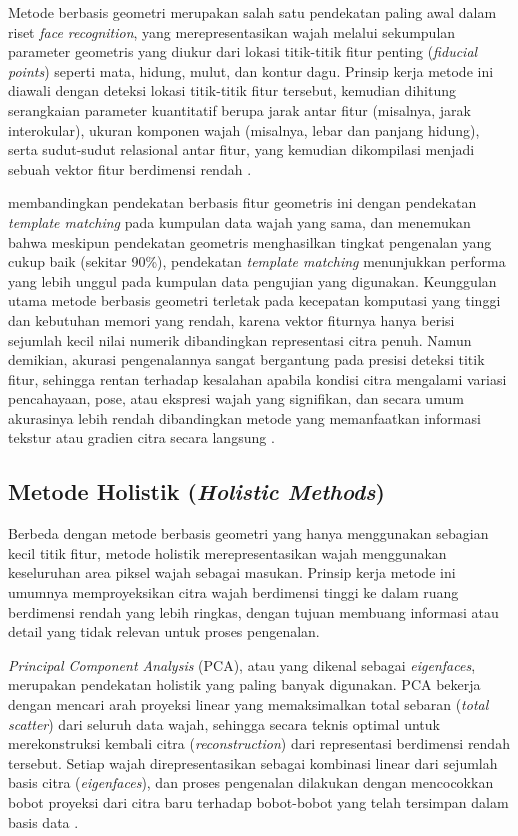 Metode berbasis geometri merupakan salah satu pendekatan paling awal dalam riset \textit{face recognition}, yang merepresentasikan wajah melalui sekumpulan parameter geometris yang diukur dari lokasi titik-titik fitur penting (\textit{fiducial points}) seperti mata, hidung, mulut, dan kontur dagu. Prinsip kerja metode ini diawali dengan deteksi lokasi titik-titik fitur tersebut, kemudian dihitung serangkaian parameter kuantitatif berupa jarak antar fitur (misalnya, jarak interokular), ukuran komponen wajah (misalnya, lebar dan panjang hidung), serta sudut-sudut relasional antar fitur, yang kemudian dikompilasi menjadi sebuah vektor fitur berdimensi rendah \autocite{Brunelli1993, Zhao2003}.

\textcite{Brunelli1993} membandingkan pendekatan berbasis fitur geometris ini dengan pendekatan \textit{template matching} pada kumpulan data wajah yang sama, dan menemukan bahwa meskipun pendekatan geometris menghasilkan tingkat pengenalan yang cukup baik (sekitar 90\%), pendekatan \textit{template matching} menunjukkan performa yang lebih unggul pada kumpulan data pengujian yang digunakan. Keunggulan utama metode berbasis geometri terletak pada kecepatan komputasi yang tinggi dan kebutuhan memori yang rendah, karena vektor fiturnya hanya berisi sejumlah kecil nilai numerik dibandingkan representasi citra penuh. Namun demikian, akurasi pengenalannya sangat bergantung pada presisi deteksi titik fitur, sehingga rentan terhadap kesalahan apabila kondisi citra mengalami variasi pencahayaan, pose, atau ekspresi wajah yang signifikan, dan secara umum akurasinya lebih rendah dibandingkan metode yang memanfaatkan informasi tekstur atau gradien citra secara langsung \autocite{Trigueros2018}.

\subsection{Metode Holistik (\textit{Holistic Methods})}

Berbeda dengan metode berbasis geometri yang hanya menggunakan sebagian kecil titik fitur, metode holistik merepresentasikan wajah menggunakan keseluruhan area piksel wajah sebagai masukan. Prinsip kerja metode ini umumnya memproyeksikan citra wajah berdimensi tinggi ke dalam ruang berdimensi rendah yang lebih ringkas, dengan tujuan membuang informasi atau detail yang tidak relevan untuk proses pengenalan.

\textit{Principal Component Analysis} (PCA), atau yang dikenal sebagai \textit{eigenfaces}, merupakan pendekatan holistik yang paling banyak digunakan. PCA bekerja dengan mencari arah proyeksi linear yang memaksimalkan total sebaran (\textit{total scatter}) dari seluruh data wajah, sehingga secara teknis optimal untuk merekonstruksi kembali citra (\textit{reconstruction}) dari representasi berdimensi rendah tersebut. Setiap wajah direpresentasikan sebagai kombinasi linear dari sejumlah basis citra (\textit{eigenfaces}), dan proses pengenalan dilakukan dengan mencocokkan bobot proyeksi dari citra baru terhadap bobot-bobot yang telah tersimpan dalam basis data \autocite{Belhumeur1997,Zhao2003}.

